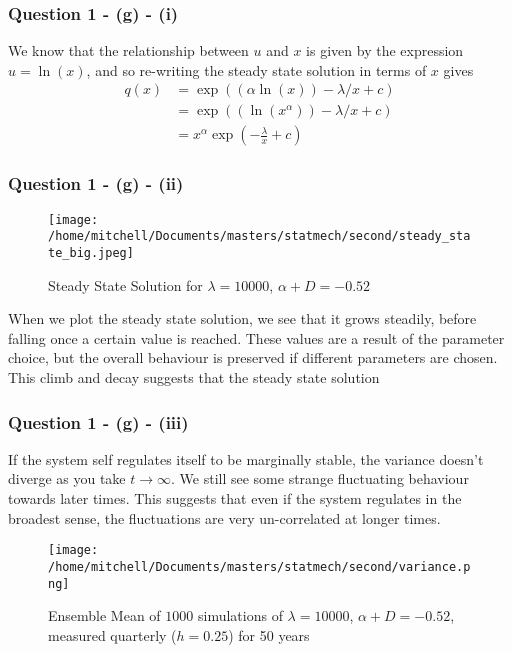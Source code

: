 \documentclass[11pt,a4paper]{article}
\begin{document}
\subsubsection{Question 1 - (g) - (i)}
\label{sec:question1:subsec:partg:subsub:i}
We know that the relationship between $u$ and $x$ is given by the expression $u = \ln(x)$, and so re-writing the steady state solution in terms of $x$ gives 
\begin{align*}
  q(x) &= \exp((\alpha \ln(x))- \lambda/x + c) \\
  &= \exp((\ln(x^\alpha))- \lambda/x + c) \\
  &= x^\alpha \exp(-\frac{\lambda}{x} + c)
\end{align*}

\subsubsection{Question 1 - (g) - (ii)}
\label{sec:question1:subsec:partg:subsub:ii}
\begin{figure}[H]\label{fig:steady_state}
  \centering
  \texttt{[image: /home/mitchell/Documents/masters/statmech/second/steady\_state\_big.jpeg]}
  \caption{Steady State Solution for $\lambda = 10000$, $ \alpha + D = -0.52 $}
  \end{figure}
When we plot the steady state solution, we see that it grows steadily, before falling once a certain value is reached. These values are a result of the parameter choice, but the overall behaviour is preserved if different parameters are chosen. This climb and decay suggests that the steady state solution 

\subsubsection{Question 1 - (g) - (iii)}
\label{sec:question1:subsec:partg:subsub:iii}
If the system self regulates itself to be marginally stable, the variance doesn't diverge as you take $t \rightarrow \infty$. We still see some strange fluctuating behaviour towards later times. This suggests that even if the system regulates in the broadest sense, the fluctuations are very un-correlated at longer times.

\begin{figure}[H]
  \centering
  \texttt{[image: /home/mitchell/Documents/masters/statmech/second/variance.png]}
  \caption{Ensemble Mean of $1000$ simulations of $\lambda = 10000$, $ \alpha + D = -0.52 $, measured quarterly ($h = 0.25$) for 50 years}
  \label{fig:ensemble_variance}
\end{figure}
\end{document}
